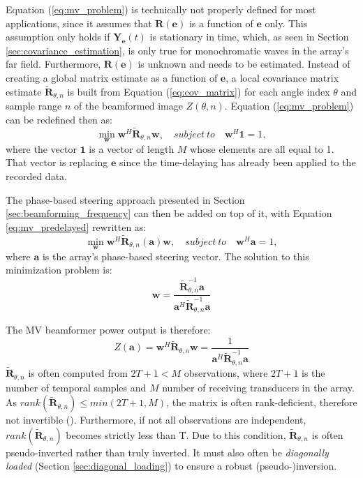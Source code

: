 Equation (\ref{eq:mv_problem}) is technically not properly defined for most applications, since it assumes that $\boldsymbol{R(e)}$ is a function of $\boldsymbol{e}$ only. This assumption only holds if $\boldsymbol{Y_e}(t)$ is stationary in time, which, as seen in Section \ref{sec:covariance_estimation}, is only true for monochromatic waves in the array's far field. Furthermore, $\boldsymbol{R(e)}$ is unknown and needs to be estimated.
Instead of creating a global matrix estimate as a function of $\boldsymbol{e}$, a local covariance matrix estimate $\boldsymbol{\tilde{R}}_{\theta,n}$ is built from Equation (\ref{eq:cov_matrix}) for each angle index $\theta$ and sample range $n$ of the beamformed image $Z(\theta,n)$.
Equation (\ref{eq:mv_problem}) can be redefined then as:
\begin{equation}
    \min_{\boldsymbol{w}} \boldsymbol{w}^H \boldsymbol{\tilde{R}}_{\theta,n} \boldsymbol{w}, \quad subject ~ to \quad \boldsymbol{w}^H \boldsymbol{1} = 1,
\label{eq:mv_predelayed}
\end{equation}
\noindent
where the vector $\boldsymbol{1}$ is a vector of length $M$ whose elements are all equal to 1. That vector is replacing $\boldsymbol{e}$ since the time-delaying has already been applied to the recorded data.

The phase-based steering approach presented in Section \ref{sec:beamforming_frequency} can then be added on top of it, with Equation \ref{eq:mv_predelayed} rewritten as:
\begin{equation}
    \min_{\boldsymbol{w}} \boldsymbol{w}^H \boldsymbol{\tilde{R}}_{\theta,n}(\boldsymbol{a}) \boldsymbol{w}, \quad subject ~ to \quad \boldsymbol{w}^H \boldsymbol{a} = 1,
\label{eq:mv_problem_fixed}
\end{equation}
\noindent
where $\boldsymbol{a}$ is the array's phase-based steering vector.
The solution to this minimization problem is:
\begin{equation}
    \boldsymbol{w} = \frac{\boldsymbol{\tilde{R}}_{\theta,n}^{-1} \boldsymbol{a}}{\boldsymbol{a}^H \boldsymbol{\tilde{R}}_{\theta,n}^{-1} \boldsymbol{a}}
\label{eq:mv_weight}
\end{equation}

\noindent
The MV beamformer power output is therefore:
\begin{equation}
    Z(\boldsymbol{a}) = \boldsymbol{w}^H \boldsymbol{\tilde{R}}_{\theta,n} \boldsymbol{w} =
    \frac{1}{\boldsymbol{a}^H \boldsymbol{\tilde{R}}_{\theta,n}^{-1} \boldsymbol{a}}
\label{eq:mv_power}
\end{equation}
\noindent
$\boldsymbol{\tilde{R}}_{\theta, n}$ is often computed from $2T+1 < M$ observations, where $2T+1$ is the number of temporal samples and $M$ number of receiving transducers in the array.  As $rank(\boldsymbol{\tilde{R}}_{\theta, n}) \leq min(2T+1, M)$, the matrix is often rank-deficient, therefore not invertible (\cite{Vignon_Focused}). Furthermore, if not all observations are independent, $rank(\boldsymbol{\tilde{R}}_{\theta, n})$ becomes strictly less than T. Due to this condition, $\boldsymbol{\tilde{R}}_{\theta, n}$ is often pseudo-inverted rather than truly inverted. It must also often be \textit{diagonally loaded} (Section \ref{sec:diagonal_loading}) to ensure a robust (pseudo-)inversion.

